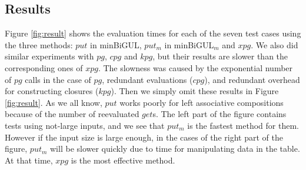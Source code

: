 \subsection{Results}



Figure \ref{fig:result} 
shows the evaluation times for each of the seven test cases using the three methods: $put$ in minBiGUL, $put_m$ in minBiGUL$_m$ and $xpg$.
We also did similar experiments with $pg$, $cpg$ and $kpg$, but their results are slower than the corresponding ones of $xpg$. The slowness was caused by the exponential number of $pg$ calls in the case of $pg$, redundant evaluations ($cpg$), and redundant overhead for constructing closures ($kpg$).
Then we simply omit these results in Figure \ref{fig:result}.
As we all know, $put$ works poorly for left associative compositions because of the number of reevaluated $get$s.
The left part of the figure contains tests using not-large inputs, and we see that $put_m$ is the fastest method for them. However if the input size is large enough, in the cases of the right part of the figure, $put_m$ will be slower quickly due to time for manipulating data in the table. At that time, $xpg$ is 
the most effective method.
